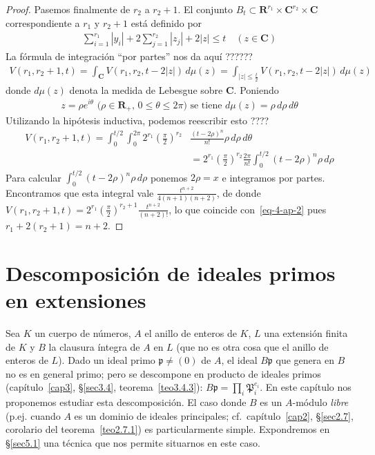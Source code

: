 \documentclass[10pt,oneside,bibtotoc,smallheadings,leqno,a5paper,DIV=12]{scrbook}
\newcommand{\RR}{\mathbf{R}}
\newcommand{\CC}{\mathbf{C}}
\newcommand{\idl}[1]{\mathfrak{#1}}
\newcommand{\abs}[1]{\left\lvert#1\right\rvert}
\numberwithin{equation}{section}
\theoremstyle{defi}
\theoremstyle{enonce}
\theoremstyle{rem}
\numberwithin{theorem}{section}
\numberwithin{proposition}{section}
\numberwithin{definition}{section}
\numberwithin{lemma}{section}
\numberwithin{corollary}{section}
\numberwithin{example}{section}
\numberwithin{footnote}{section}%
\begin{document}
\begin{proof}
Pasemos finalmente de $r_{2}$ a $r_{2}+1$. El conjunto $B_{t}\subset\RR^{r_{1}}\times\CC^{r_{2}}\times\CC$
correspondiente a $r_{1}$ y $r_{2}+1$ est\'a definido por
\begin{gather*}
\sum_{i=1}^{r_{1}}\abs{y_{i}}+2\sum_{j=1}^{r_{2}}\abs{z_{j}}+2\abs{z}\leq t\quad(z\in\CC)
\end{gather*}
La f\'ormula de integraci\'on ``por partes'' nos da aqu\'i ??????
\begin{gather*}
V(r_{1},r_{2}+1,t)=\int_{\CC}V(r_{1},r_{2},t-2\abs{z})\,d\mu(z)=\int_{\abs{z}\leq\frac{t}{2}}V(r_{1},r_{2},t-2\abs{z})\,d\mu(z)
\end{gather*}
donde $d\mu(z)$ denota la medida de Lebesgue sobre $\CC$. Poniendo
\begin{gather*}
\text{$z = \rho e^{i\theta}$ ($\rho\in\RR_{+}$, $0\leq\theta\leq 2\pi$) se tiene $d\mu(z) = \rho\,d\rho\,d\theta$}
\end{gather*}
Utilizando la hip\'otesis inductiva, podemos reescribir esto ????
\begin{align*}
V(r_{1},r_{2}+1,t) = \int_{0}^{t/2}\int_{0}^{2\pi}2^{r_{1}}\left(\frac{\pi}{2}\right)^{r_{2}}
&\frac{(t-2\rho)^{n}}{n!}\rho\,d\rho\,d\theta\\
&=2^{r_{1}}\left(\frac{\pi}{2}\right)^{r_{2}}\frac{2\pi}{n!}\int_{0}^{t/2}(t-2\rho)^{n}\rho\,d\rho
\end{align*}
Para calcular $\int_{0}^{t/2}(t-2\rho)^{n}\rho\,d\rho$ ponemos $2\rho = x$ e integramos por partes.
Encontramos que esta integral vale $\frac{t^{n+2}}{4(n+1)(n+2)}$, de donde
$V(r_{1},r_{2}+1,t) = 2^{r_{1}}\left(\frac{\pi}{2}\right)^{r_{2}+1}\frac{t^{n+2}}{(n+2)!}$, lo que coincide
con~\eqref{eq-4-ap-2} pues $r_{1}+2(r_{2}+1)=n+2$.
\end{proof}

\chapter{Descomposici\'on de ideales primos en extensiones}\label{cap5}

Sea $K$ un cuerpo de n\'umeros, $A$ el anillo de enteros de $K$, $L$ una extensi\'on finita de $K$ y $B$
la clausura \'integra de $A$ en $L$ (que no es otra cosa que el anillo de enteros de $L$). Dado un ideal primo
$\idl{p}\neq(0)$ de $A$, el ideal $B\idl{p}$ que genera en $B$ no es en general primo; pero se descompone en
producto de ideales primos (cap\'itulo~\ref{cap3}, \S\ref{sec3.4}, teorema~\ref{teo3.4.3}): $B\idl{p}=\prod_{i}\idl{P}_{i}^{e_{i}}$. En este
cap\'itulo nos proponemos estudiar esta descomposici\'on. El caso donde $B$ es un $A$-m\'odulo {\em libre}
(p.ej. cuando $A$ es un dominio de ideales principales;
cf.~cap\'itulo~\ref{cap2}, \S\ref{sec2.7}, corolario del teorema~\ref{teo2.7.1}) es particularmente
simple. Expondremos en \S\ref{sec5.1} una t\'ecnica que nos permite situarnos en este caso.
\end{document}
